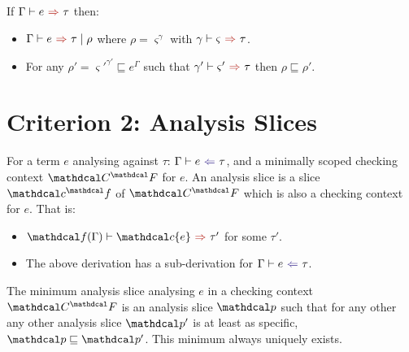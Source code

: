 \begin{conjecture}[Correctness]
\label{conj:SynthesisSliceCorrectness}
If $\synthesis{e}{\tau}$ then:
\begin{itemize}
\item $\synthesisslice{e}{\tau}{\rho}$ where $\rho = \varsigma^\gamma$ with $\synthesis[\gamma]{\varsigma}{\tau}$.
\item For any $\rho' = \varsigma'^{\gamma'} \sqsubseteq e^\Gamma$ such that $\synthesis[\gamma']{\varsigma'}{\tau}$ then $\rho \sqsubseteq \rho'$.
\end{itemize}
\end{conjecture}

\section{Criterion 2: Analysis Slices}
\begin{definition}\label{def:analysisslice}
For a term $e$ analysing against $\tau$: $\analysis{e}{\tau}$, and a minimally scoped checking context $\C^\F$ for $e$. An analysis slice is a slice $\Cs^\f$ of $\C^\F$ which is also a checking context for $e$. That is:
\begin{itemize}
\item $\synthesis[\f(\Gamma)]{\Cs\{e\}}{\tau'}$ for some $\tau'$.
\item The above derivation has a sub-derivation for $\analysis{e}{\tau}$. 
\end{itemize}
\end{definition}
\begin{conjecture}\label{conj:AnalysisSliceUniqueness}
The minimum analysis slice analysing $e$ in a checking context $\C^\F$ is an analysis slice $\p$ such that for any other any other analysis slice $\p'$ is at least as specific, $\p \sqsubseteq \p'$. This minimum always uniquely exists.
\end{conjecture}

